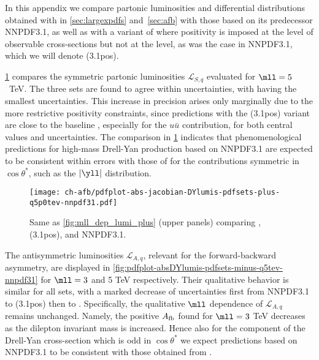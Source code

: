 
In this appendix we compare partonic luminosities
and \lhc differential distributions obtained with  in
\cref{sec:largexpdfs}
and~\ref{sec:afb} with those based 
on its predecessor
NNPDF3.1, as well as with a variant of 
where positivity is imposed at the level of observable cross-sections but
not at the \pdf level, as was the case in  NNPDF3.1, which we will denote
(3.1pos).

\cref{fig:pdfplot-absDYlumis-pdfsets-plus-q5tev-nnpdf31}
compares the 
symmetric partonic luminosities $\mathcal{L}_{S,q}$
evaluated for $\mll=5$~TeV.
%
The three sets are found to agree within uncertainties,
with  having the smallest uncertainties.
%
This increase in precision
arises only marginally due to the more restrictive positivity constraints,
since predictions with the (3.1pos) variant 
are close to the baseline , especially 
for the $u\bar{u}$ contribution, for both central values and uncertainties.
%
The comparison in \cref{fig:pdfplot-absDYlumis-pdfsets-plus-q5tev-nnpdf31}
indicates that phenomenological predictions for high-mass Drell-Yan
production based on NNPDF3.1 are expected
to be consistent within errors with those of  for the contributions
symmetric in $\cos\theta^*$, such as the $|\yll|$ distribution.

\begin{figure}[!t]
 \centering
 \texttt{[image: ch-afb/pdfplot-abs-jacobian-DYlumis-pdfsets-plus-q5p0tev-nnpdf31.pdf]}
 \caption{Same as \cref{fig:mll_dep_lumi_plus} (upper panels) comparing
, (3.1pos), and NNPDF3.1.
 }    
 \label{fig:pdfplot-absDYlumis-pdfsets-plus-q5tev-nnpdf31}
\end{figure}

The antisymmetric luminosities $\mathcal{L}_{A,q}$, relevant for the
forward-backward asymmetry, are displayed in \cref{fig:pdfplot-absDYlumis-pdfsets-minus-q5tev-nnpdf31}
for $\mll = 3$ and 5 TeV respectively.
%
Their qualitative behavior is similar for all  \pdf sets,
with a marked decrease of \pdf uncertainties first from NNPDF3.1
to  (3.1pos)  then
to .
%
Specifically, the qualitative $\mll$ dependence
of $\mathcal{L}_{A,q}$ remains unchanged. Namely, the positive $A_{\rm fb}$
found for $\mll= 3$ TeV decreases 
as the dilepton invariant mass is increased.
%
Hence also for the component of the Drell-Yan cross-section which is odd
in $\cos\theta^*$ we expect \lhc predictions based on NNPDF3.1 to be consistent
with those obtained from .

